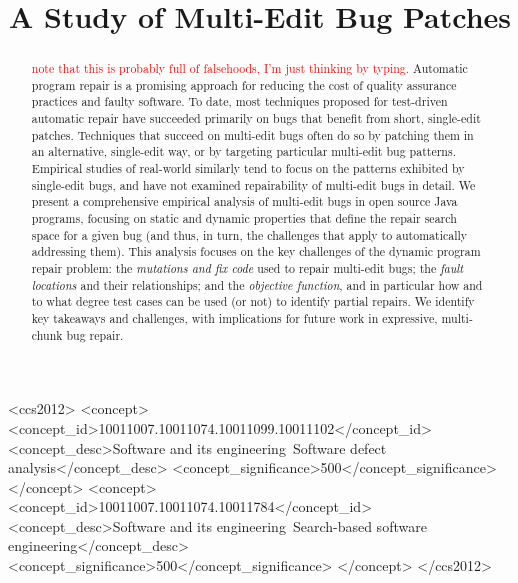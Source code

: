 \documentclass[sigconf, timestamp-false, anonymous=true]{acmart}
\newcommand\todo[1]{\textcolor{red}{#1}}
\begin{document}
\title{A Study of Multi-Edit Bug Patches}


\begin{abstract}
  \todo{note that this is probably full of falsehoods, I'm just thinking by
    typing.} Automatic program repair is a promising approach for reducing the
    cost of quality assurance practices and faulty software. To date, most
    techniques proposed for test-driven automatic repair have succeeded
    primarily on bugs that benefit from short, single-edit patches. Techniques
    that succeed on multi-edit bugs often do so by patching them in an
    alternative, single-edit way, or by targeting particular multi-edit bug
    patterns. Empirical studies of real-world similarly tend to focus on the
    patterns exhibited by single-edit bugs, and have not examined repairability
    of multi-edit bugs in detail. We present a comprehensive empirical analysis
    of multi-edit bugs in open source Java programs, focusing on static and
    dynamic properties that define the repair search space for a given bug (and
    thus, in turn, the challenges that apply to automatically addressing them).
    This analysis focuses on the key challenges of the dynamic program repair
    problem: the \emph{mutations and fix code} used to repair multi-edit bugs;
    the \emph{fault locations} and their relationships; and the \emph{objective
      function}, and in particular how and to what degree test cases can be used
    (or not) to identify partial repairs. We identify key takeaways and
    challenges, with implications for future work in expressive, multi-chunk bug
    repair.
\end{abstract}

\begin{CCSXML}
<ccs2012>
<concept>
<concept_id>10011007.10011074.10011099.10011102</concept_id>
<concept_desc>Software and its engineering~Software defect analysis</concept_desc>
<concept_significance>500</concept_significance>
</concept>
<concept>
<concept_id>10011007.10011074.10011784</concept_id>
<concept_desc>Software and its engineering~Search-based software engineering</concept_desc>
<concept_significance>500</concept_significance>
</concept>
</ccs2012>
\end{CCSXML}

\end{document}
